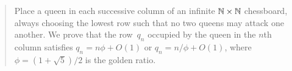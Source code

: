 
\begin{abstract}
Place a queen in each successive column of an infinite $\N\times\N$ chessboard,
always choosing the lowest row such that no two queens may attack one another. 
We prove that the row~$q_n$ occupied by the queen in the $n$th column satisfies 
$q_n=n\phi+O(1)$ or $q_n=n/\phi+O(1)$, where $\phi=(1+\sqrt5)/2$ is the golden ratio.
\end{abstract}
\maketitle
\thispagestyle{empty}

